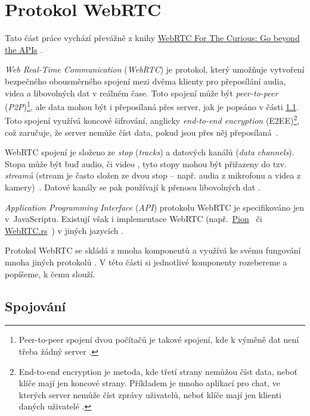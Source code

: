 \section{Protokol WebRTC}\label{webRTC}

Tato část práce vychází převážně z knihy
\href{https://webrtcforthecurious.com/}{WebRTC For The Curious: Go beyond the
    APIs} \cite{WebRTCForTheCurious}.

\textit{Web Real-Time Communication} (\textit{WebRTC}) je protokol, který
umožňuje vytvoření bezpečného obousměrného spojení mezi dvěma klienty pro
přeposílání audia, videa a libovolných dat v reálném čase. Toto spojení může být
\textit{peer-to-peer} (\textit{P2P})\footnote{Peer-to-peer spojení dvou počítačů
    je takové spojení, kde k výměně dat není třeba žádný server
    \cite{MerriamWebster-PeerToPeer}.}, ale data mohou být i přeposílaná přes
server, jak je popsáno v části \ref{connecting}. Toto spojení využívá koncové
šifrování, anglicky \textit{end-to-end encryption} (E2EE)\footnote{End-to-end
    encryption je metoda, kde třetí strany nemůžou číst data, neboť klíče mají jen
    koncové strany. Příkladem je mnoho aplikací pro chat, ve kterých server nemůže
    číst zprávy uživatelů, neboť klíče mají jen klienti daných uživatelé
    \cite{IBM-EndToEndEncryption}.}, což zaručuje, že server nemůže číst data, pokud
jsou přes něj přeposílaná~\cite{WebRTCForTheCurious}.

WebRTC spojení je složeno ze \textit{stop} (\textit{tracks}) a datových kanálů
(\textit{data channels}). Stopa může být buď audio, či video
\cite{MDN-WebRTC-MediaStreamTrack}, tyto stopy mohou být přiřazeny do tzv.
\textit{streamů} (stream je často složen ze dvou stop -- např. audia z mikrofonu
a videa z kamery)~\cite{MDN-WebRTC-MediaStream}. Datové kanály se pak používají
k přenosu libovolných dat \cite{WebRTCORG-GettingStarted-DataChannels}.

\textit{Application Programming Interface} (\textit{API}) protokolu WebRTC je
specifikováno jen v~JavaScriptu. Existují však i implementace WebRTC
(např.~\href{https://github.com/pion/webrtc}{Pion}~\cite{GitHub-Pion-WebRTC} či
\href{https://github.com/webrtc-rs/webrtc}{WebRTC.rs}~\cite{GitHub-WebRTCRS-WebRTC})
v jiných jazycích \cite{WebRTCForTheCurious}.

Protokol WebRTC se skládá z mnoha komponentů a využívá ke svému fungování mnoha
jiných protokolů \cite{WebRTCForTheCurious}. V této části si jednotlivé
komponenty rozebereme a popíšeme, k čemu slouží.

\subsection{Spojování}\label{connecting}

